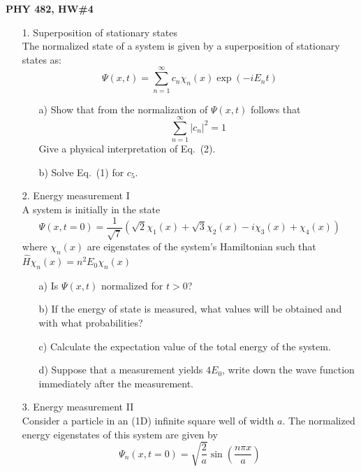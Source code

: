 \documentclass[11pt]{article}
\begin{document}
\thispagestyle{empty}


\centerline{\bf PHY 482, HW\#4}

\begin{itemize}
%
\item[1.] Superposition of stationary states\\
The normalized state of a system is given by a superposition of stationary states as:
\begin{equation}
\Psi(x,t) = \sum\limits_{n=1}^{\infty} c_n \chi_n(x) \exp(-iE_n t)
\end{equation}
\begin{itemize}
\item[a)]
Show that from the normalization of $\Psi(x,t)$ follows that
\begin{equation}
\sum\limits_{n=1}^{\infty} |c_n|^2 = 1
\end{equation}
Give a physical interpretation of Eq.\ (2).
\item[b)]
Solve Eq.\ (1) for $c_5$.
\end{itemize}
%
\vspace*{0.25cm}
%
\item[2.] Energy measurement I\\
A system is initially in the state
\begin{displaymath}
\Psi(x,t=0) =
\frac{1}{\sqrt{7}}\left(
\sqrt{2}\chi_1(x)
+\sqrt{3}\chi_2(x)
-i\chi_3(x)
+\chi_4(x)
\right)
\end{displaymath}
where $\chi_n(x)$ are eigenstates of the system's Hamiltonian such that ${\hat H}\chi_n(x)=n^2 E_0\chi_n(x)$
\begin{itemize}
\item[a)]
Is $\Psi(x,t)$ normalized for $t>0$?
\item[b)]
If the energy of state is measured, what values will be obtained and with what probabilities?
\item[c)]
Calculate the expectation value of the total energy of the system.
\item[d)]
Suppose that a measurement yields $4E_0$, write down the wave function immediately after the measurement.
\end{itemize}
%
\vspace*{0.25cm}
%
\item[3.] Energy measurement II\\
Consider a particle in an (1D) infinite square well of width $a$. The normalized energy eigenstates of this system are given by \begin{displaymath}
\Psi_n(x,t=0) = \sqrt{\frac{2}{a}} \sin\left(\frac{n\pi x}{a}\right)

\end{displaymath}
\end{itemize}
\end{document}
